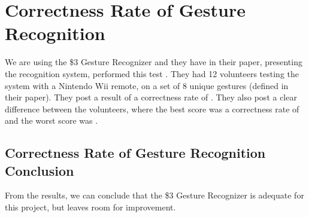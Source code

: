\section{Correctness Rate of Gesture Recognition}
We are using the \$3 Gesture Recognizer and they have in their paper, 
presenting the recognition system, performed this test \cite{threedollar}.
They had \num{12} volunteers testing the system with a Nintendo Wii remote, 
on a set of \num{8} unique gestures (defined in their paper).
They post a result of a correctness rate of . 
They also post a clear difference between the volunteers, 
where the best score was a correctness rate of  and the worst score was . 
\subsection{Correctness Rate of Gesture Recognition Conclusion}
From the results, we can conclude that the \$3 Gesture Recognizer is adequate for this project, but leaves room for improvement. 
